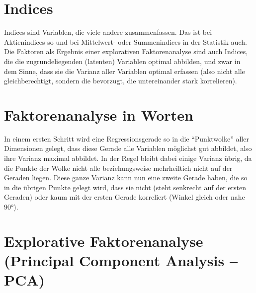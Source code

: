 \documentclass[
  10pt,
  letterpaper,
  a4paper, twoside]{scrreprt}
\begin{document}
\section{Indices}\label{indices}

Indices sind Variablen, die viele andere zusammenfassen. Das ist bei
Aktienindices so und bei Mittelwert- oder Summenindices in der Statistik
auch. Die Faktoren als Ergebnis einer explorativen Faktorenanalyse sind
auch Indices, die die zugrundeliegenden (latenten) Variablen optimal
abbilden, und zwar in dem Sinne, dass sie die Varianz aller Variablen
optimal erfassen (also nicht alle gleichberechtigt, sondern die
bevorzugt, die untereinander stark korrelieren).

\section{Faktorenanalyse in Worten}\label{faktorenanalyse-in-worten}

In einem ersten Schritt wird eine Regressionsgerade so in die
\enquote{Punktwolke} aller Dimensionen gelegt, dass diese Gerade alle
Variablen möglichst gut abbildet, also ihre Varianz maximal abbildet. In
der Regel bleibt dabei einige Varianz übrig, da die Punkte der Wolke
nicht alle beziehungsweise mehrheiltich nicht auf der Geraden liegen.
Diese ganze Varianz kann nun eine zweite Gerade haben, die so in die
übrigen Punkte gelegt wird, dass sie nicht (steht senkrecht auf der
ersten Geraden) oder kaum mit der ersten Gerade korreliert (Winkel
gleich oder nahe 90°).

\section{Explorative Faktorenanalyse (Principal Component Analysis --
PCA)}\label{explorative-faktorenanalyse-principal-component-analysis-pca}
\end{document}
